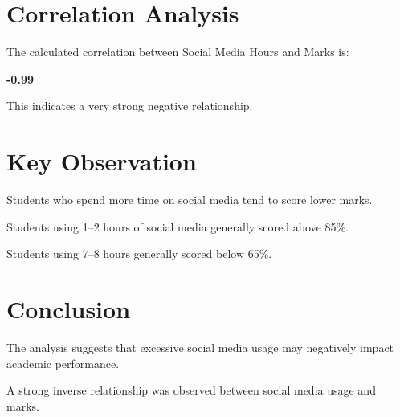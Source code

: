 \documentclass[
]{article}
\begin{document}
\section{Correlation Analysis}\label{correlation-analysis}

The calculated correlation between Social Media Hours and Marks is:

\textbf{-0.99}

This indicates a very strong negative relationship.

\section{Key Observation}\label{key-observation}

Students who spend more time on social media tend to score lower marks.

Students using 1--2 hours of social media generally scored above 85\%.

Students using 7--8 hours generally scored below 65\%.

\section{Conclusion}\label{conclusion}

The analysis suggests that excessive social media usage may negatively
impact academic performance.

A strong inverse relationship was observed between social media usage
and marks.
\end{document}
